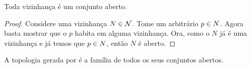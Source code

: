 \begin{fact}
	Toda vizinhança é um conjunto aberto.
\end{fact}

\begin{proof}
	Considere uma vizinhança $N \in \mathcal{N}$. Tome um arbitrário $p \in N$. Agora basta mostrar que o $p$ habita em alguma vizinhança. Ora, como o $N$ já é uma vizinhança e já temos que $p \in N$, então $N$ é aberto.
\end{proof}

\begin{definition}
	A topologia gerada por  é a família  de todos os seus conjuntos abertos.
\end{definition}